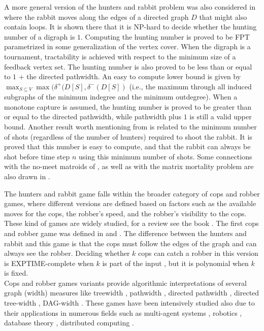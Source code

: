 \documentclass[runningheads]{llncs}
\begin{document}
{A more general version of the hunters and rabbit problem  was also considered in \cite{ourpaper,benameur2024complexityresultscopsrobber} where the rabbit moves along the edges of a directed graph $D$ that might also contain loops.  
It is shown there that it is NP-hard to decide whether the hunting number of a digraph is $1$. Computing the hunting number is  proved to be FPT parametrized in some generalization of the vertex cover. When the digraph is a tournament, tractability is achieved with respect to the minimum size of a feedback vertex set. The hunting number is also proved to be less than or equal to $1$ + the directed pathwidth. An easy to compute  lower bound  is given by $\max_{S \subseteq V} \max(\delta^+(D[S],\delta^-(D[S])$ (i.e., the maximum through all induced subgraphs of the minimum indegree and the minimum outdegree). When a monotone capture is assumed,  the hunting number is proved to be greater than or equal to the directed pathwidth, while pathwidth plus $1$ is still a valid upper bound. Another result worth mentioning  from \cite{ourpaper} is related to the minimum number of shots (regardless of  the number of hunters) required to shoot the rabbit. It is proved that this number is easy to compute, and that the rabbit can always be shot before time step $n$ using this minimum number of shots. Some connections with the no-meet matroids of \cite{BENAMEUR2022}, as well as with the matrix mortality problem are also drawn in  \cite{benameur2024complexityresultscopsrobber}. }


The hunters and rabbit game falls within the broader category of cops and robber games, where different versions are defined based on factors such as the available moves for the cops, the robber's speed, and the robber's visibility to the cops. These kind of games are widely studied, for a review see the book \cite{Bontato}. The first cops and robber game was defined in \cite{Quillot} and \cite{NOWAKOWSKI1983235}. The difference between the hunters and rabbit and this game is that the cops must follow the edges of the graph and can always see the robber. Deciding whether $k$ cops can catch a robber in this version is EXPTIME-complete when $k$ is part of the input \cite{KINNERSLEY2015201}, but it is polynomial when $k$ is fixed.\\
Cops and robber games variants provide algorithmic interpretations of several graph (width) measures like treewidth \cite{SEYMOUR199322}, pathwidth \cite{Parsons1978PursuitevasionIA}, directed pathwidth \cite{Barat}, directed tree-width \cite{seymourdirtw}, DAG-width \cite{10.5555, bang2016dag}. These games have been intensively studied also due to their applications in numerous fields such as multi-agent systems \cite{AlejandroIsaza,Stern2019}, robotics \cite{chungrobots}, database theory \cite{GOTTLOB2003775}, distributed computing \cite{Nisse2019}.
\end{document}
